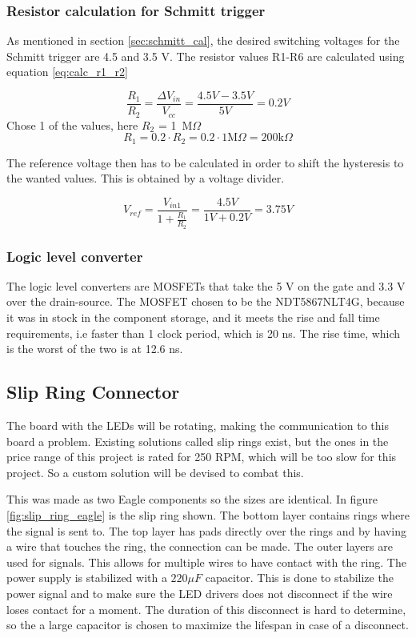 \subsubsection*{Resistor calculation for Schmitt trigger}
As mentioned in section \ref{sec:schmitt_cal}, the desired switching voltages for the Schmitt trigger are 4.5 and 3.5 V.
The resistor values R1-R6 are calculated using equation \ref{eq:calc_r1_r2}\cite{book:prac_ele}

\begin{equation}\label{eq:calc_r1_r2}
 \frac{R_1}{R_2} = \frac{\Delta V_{in}}{V_{cc}} = \frac{4.5V-3.5V}{5V} = 0.2V
\end{equation}
Chose 1 of the values, here $R_2$ = 1\ M$\Omega$
\begin{equation}
 R_1 = 0.2\cdot R_2 = 0.2\cdot 1 \text{M} \Omega = 200 \text{k}\Omega
\end{equation}

The reference voltage then has to be calculated in order to shift the hysteresis to the wanted values.
This is obtained by a voltage divider.

\begin{equation}
 V_{ref} = \frac{V_{in1}}{1+\frac{R_1}{R_2}} = \frac{4.5V}{1V+0.2V} = 3.75 V
\end{equation}

\subsubsection*{Logic level converter}

The logic level converters are MOSFETs that take the 5 V on the gate and 3.3 V over the drain-source.
The MOSFET chosen to be the NDT5867NLT4G, because it was in stock in the component storage, and it meets the rise and fall time requirements, i.e faster than 1 clock period, which is 20 ns.
The rise time, which is the worst of the two is at 12.6 ns.

\subsection{Slip Ring Connector}\label{sec:ring_connector}
The board with the LEDs will be rotating, making the communication to this board a problem.
Existing solutions called slip rings exist, but the ones in the price range of this project is rated for 250 RPM, which will be too slow for this project.
So a custom solution will be devised to combat this.

This was made as two Eagle components so the sizes are identical.
In figure \ref{fig:slip_ring_eagle} is the slip ring shown.
The bottom layer contains rings where the signal is sent to.
The top layer has pads directly over the rings and by having a wire that touches the ring, the connection can be made.
The outer layers are used for signals.
This allows for multiple wires to have contact with the ring.
The power supply is stabilized with a $220 \mu F$ capacitor.
This is done to stabilize the power signal and to make sure the LED drivers does not disconnect if the wire loses contact for a moment.
The duration of this disconnect is hard to determine, so the a large capacitor is chosen to maximize the lifespan in case of a disconnect.

